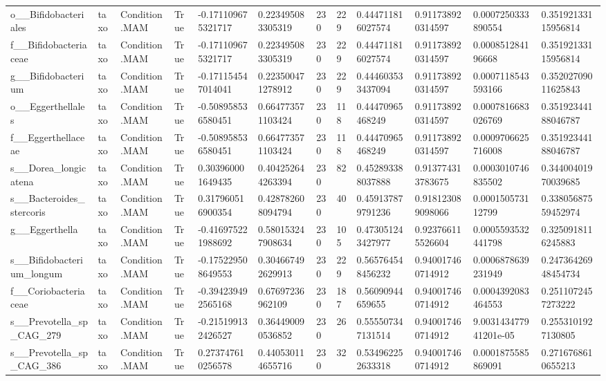 \begin{longtable}{llllllllllll}
o\_\_Bifidobacteriales & taxo & Condition.MAM & True & -0.171109675321717 & 0.223495083305319 & 230 & 229 & 0.444711816027574 & 0.911738920314597 & 0.0007250333890554 & 0.35192133115956814 \\
f\_\_Bifidobacteriaceae & taxo & Condition.MAM & True & -0.171109675321717 & 0.223495083305319 & 230 & 229 & 0.444711816027574 & 0.911738920314597 & 0.000851284196668 & 0.35192133115956814 \\
g\_\_Bifidobacterium & taxo & Condition.MAM & True & -0.171154547014041 & 0.223500471278912 & 230 & 229 & 0.444603533437094 & 0.911738920314597 & 0.0007118543593166 & 0.35202709011625843 \\
o\_\_Eggerthellales & taxo & Condition.MAM & True & -0.508958536580451 & 0.664773571103424 & 230 & 118 & 0.44470965468249 & 0.911738920314597 & 0.0007816683026769 & 0.35192344188046787 \\
f\_\_Eggerthellaceae & taxo & Condition.MAM & True & -0.508958536580451 & 0.664773571103424 & 230 & 118 & 0.44470965468249 & 0.911738920314597 & 0.0009706625716008 & 0.35192344188046787 \\
s\_\_Dorea\_longicatena & taxo & Condition.MAM & True & 0.303960001649435 & 0.404252644263394 & 230 & 82 & 0.452893388037888 & 0.913774313783675 & 0.0003010746835502 & 0.34400401970039685 \\
s\_\_Bacteroides\_stercoris & taxo & Condition.MAM & True & 0.317960516900354 & 0.428782608094794 & 230 & 40 & 0.459137879791236 & 0.918123089098066 & 0.000150573112799 & 0.33805687559452974 \\
g\_\_Eggerthella & taxo & Condition.MAM & True & -0.416975221988692 & 0.580153247908634 & 230 & 105 & 0.473051243427977 & 0.923766115526604 & 0.0005593532441798 & 0.3250918116245883 \\
s\_\_Bifidobacterium\_longum & taxo & Condition.MAM & True & -0.175229508649553 & 0.304667492629913 & 230 & 229 & 0.565764548456232 & 0.940017460714912 & 0.0006878639231949 & 0.24736426948454734 \\
f\_\_Coriobacteriaceae & taxo & Condition.MAM & True & -0.394239492565168 & 0.67697236962109 & 230 & 187 & 0.56090944659655 & 0.940017460714912 & 0.0004392083464553 & 0.2511072457273222 \\
s\_\_Prevotella\_sp\_CAG\_279 & taxo & Condition.MAM & True & -0.215199132426527 & 0.364490090536852 & 230 & 26 & 0.555507347131514 & 0.940017460714912 & 9.003143477941201e-05 & 0.2553101927130805 \\
s\_\_Prevotella\_sp\_CAG\_386 & taxo & Condition.MAM & True & 0.273747610256578 & 0.440530114655716 & 230 & 32 & 0.534962252633318 & 0.940017460714912 & 0.0001875585869091 & 0.2716768610655213 \\

\end{longtable}
